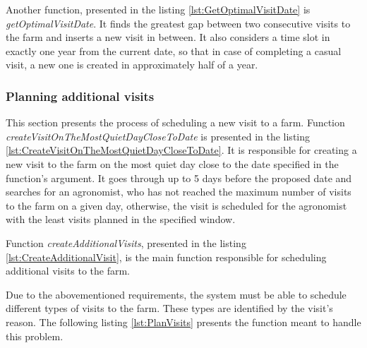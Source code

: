 

Another function, presented in the listing \ref{lst:GetOptimalVisitDate} is \textit{getOptimalVisitDate}. It finds the greatest gap between two consecutive visits to the farm and inserts a new visit in between. It also considers a time slot in exactly one year from the current date, so that in case of completing a casual visit, a new one is created in approximately half of a year.



\subsubsection*{Planning additional visits}

This section presents the process of scheduling a new visit to a farm. Function \textit{createVisitOnTheMostQuietDayCloseToDate} is presented in the listing \ref{lst:CreateVisitOnTheMostQuietDayCloseToDate}. It is responsible for creating a new visit to the farm on the most quiet day close to the date specified in the function's argument. It goes through up to 5 days before the proposed date and searches for an agronomist, who has not reached the maximum number of visits to the farm on a given day, otherwise, the visit is scheduled for the agronomist with the least visits planned in the specified window.



Function \textit{createAdditionalVisits}, presented in the listing \ref{lst:CreateAdditionalVisit}, is the main function responsible for scheduling additional visits to the farm.



Due to the abovementioned requirements, the system must be able to schedule different types of visits to the farm. These types are identified by the visit's reason. The following listing \ref{lst:PlanVisits} presents the function meant to handle this problem.


